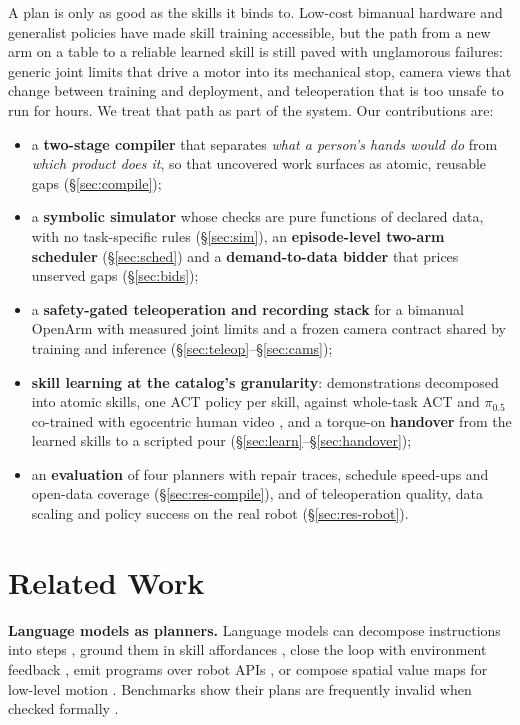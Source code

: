 \documentclass[10pt,twocolumn,letterpaper]{article}
\begin{document}
A plan is only as good as the skills it binds to. Low-cost bimanual hardware \citep{zhao2023aloha,fu2024mobilealoha,wu2024gello}
and generalist policies \citep{black2024pi0,pi2025pi05} have made skill training accessible, but the path from a
new arm on a table to a reliable learned skill is still paved with unglamorous failures: generic joint limits that
drive a motor into its mechanical stop, camera views that change between training and deployment, and teleoperation
that is too unsafe to run for hours. We treat that path as part of the system. Our contributions are:
\begin{itemize}
\item a \textbf{two-stage compiler} that separates \emph{what a person's hands would do} from \emph{which product does
it}, so that uncovered work surfaces as atomic, reusable gaps (\S\ref{sec:compile});
\item a \textbf{symbolic simulator} whose checks are pure functions of declared data, with no task-specific rules
(\S\ref{sec:sim}), an \textbf{episode-level two-arm scheduler} (\S\ref{sec:sched}) and a
\textbf{demand-to-data bidder} that prices unserved gaps (\S\ref{sec:bids});
\item a \textbf{safety-gated teleoperation and recording stack} for a bimanual OpenArm with measured joint limits and a
frozen camera contract shared by training and inference (\S\ref{sec:teleop}--\S\ref{sec:cams});
\item \textbf{skill learning at the catalog's granularity}: demonstrations decomposed into atomic skills, one ACT
policy \citep{zhao2023aloha} per skill, against whole-task ACT and $\pi_{0.5}$ \citep{pi2025pi05} co-trained with
egocentric human video \citep{hoque2025egodex,kareer2024egomimic}, and a torque-on \textbf{handover} from the learned
skills to a scripted pour (\S\ref{sec:learn}--\S\ref{sec:handover});
\item an \textbf{evaluation} of four planners with repair traces, schedule speed-ups and open-data coverage
(\S\ref{sec:res-compile}), and of teleoperation quality, data scaling and policy success on the real robot
(\S\ref{sec:res-robot}).
\end{itemize}

\section{Related Work}
\textbf{Language models as planners.} Language models can decompose instructions into steps \citep{huang2022zeroshot},
ground them in skill affordances \citep{ahn2022saycan}, close the loop with environment feedback
\citep{huang2022innermonologue}, emit programs over robot APIs \citep{liang2023cap,singh2023progprompt}, or compose
spatial value maps for low-level motion \citep{huang2023voxposer}. Benchmarks show their plans are frequently invalid
when checked formally \citep{valmeekam2023planbench}.
\end{document}

